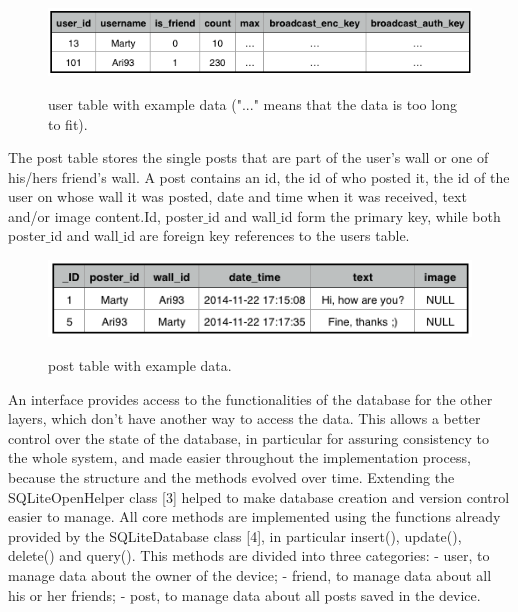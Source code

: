 \documentclass{report}
\newcommand{\lfig}[1]{\label{fig:#1}}
\begin{document}
\begin{figure}[H]
	\centering
    \includegraphics[width=\columnwidth]{users_table_example.png}
    \lfig{users_table_example}
    \vspace{-5mm} %
	\caption{user table with example data ("..." means that the data is too long to fit).}
\end{figure}

The post table stores the single posts that are part of the user's wall or one of his/hers friend's wall. 
A post contains an id, the id of who posted it, the id of the user on whose wall it was posted, date and time when it was received, text and/or image content.Id, poster$\_$id and wall$\_$id form the primary key, while both poster$\_$id and wall$\_$id are foreign key references to the users table.

\begin{figure}[H]
	\centering
    \includegraphics[width=\columnwidth]{post_table_example.png}
    \lfig{post_table_example}
    \vspace{-5mm} %
	\caption{post table with example data.}
\end{figure}


An interface provides access to the functionalities of the database for the other layers, which don't have another way to access the data. This allows a better control over the state of the database, in particular for assuring consistency to the whole system, and made easier throughout the implementation process, because the structure and the methods evolved over time.
Extending the SQLiteOpenHelper class [3] helped to make database creation and version control easier to manage.
All core methods are implemented using the functions already provided by the SQLiteDatabase class [4], in particular insert(), update(), delete() and query(). This methods are divided into three categories:
- user, to manage data about the owner of the device;
- friend, to manage data about all his or her friends;
- post, to manage data about all posts saved in the device.
\end{document}
